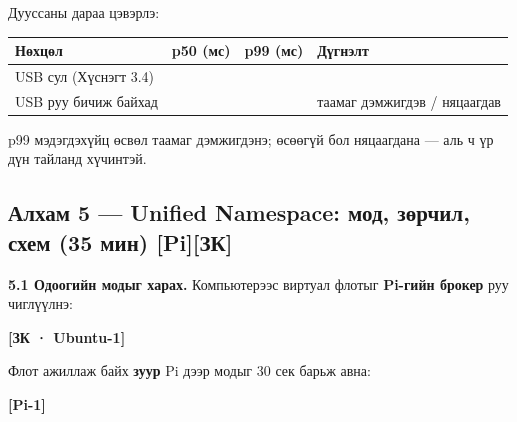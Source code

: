 Дууссаны дараа цэвэрлэ:

\begin{Shaded}
\begin{Highlighting}[]
\KeywordTok{\&\&} 
\end{Highlighting}
\end{Shaded}

\begingroup\scriptsize\begin{longtable}[]{@{}llll@{}}
\toprule
Нөхцөл & p50 (мс) & p99 (мс) & Дүгнэлт\tabularnewline
\midrule
\endhead
USB сул (Хүснэгт 3.4) & & &\tabularnewline
USB руу бичиж байхад & & & таамаг дэмжигдэв / няцаагдав\tabularnewline
\bottomrule
\end{longtable}\endgroup

p99 мэдэгдэхүйц өсвөл таамаг дэмжигдэнэ; өсөөгүй бол няцаагдана --- аль ч үр дүн тайланд хүчинтэй.

\hypertarget{ux430ux43bux445ux430ux43c-5-unified-namespace-ux43cux43eux434-ux437ux4e9ux440ux447ux438ux43b-ux441ux445ux435ux43c-35-ux43cux438ux43d-piux437ux43a}{%
\subsection{Алхам 5 --- Unified Namespace: мод, зөрчил, схем (35 мин) {[}Pi{]}{[}ЗК{]}}\label{ux430ux43bux445ux430ux43c-5-unified-namespace-ux43cux43eux434-ux437ux4e9ux440ux447ux438ux43b-ux441ux445ux435ux43c-35-ux43cux438ux43d-piux437ux43a}}

\textbf{5.1 Одоогийн модыг харах.} Компьютерээс виртуал флотыг \textbf{Pi-гийн брокер} руу чиглүүлнэ:

\textbf{{[}ЗК · Ubuntu-1{]}}

\begin{Shaded}
\begin{Highlighting}[]
\OperatorTok{\textless{}}\OperatorTok{\textgreater{}}
\end{Highlighting}
\end{Shaded}

Флот ажиллаж байх \textbf{зуур} Pi дээр модыг 30 сек барьж авна:

\textbf{{[}Pi-1{]}}

\begin{Shaded}
\begin{Highlighting}[]
 \KeywordTok{\textbackslash{}}
     \KeywordTok{|} 
\end{Highlighting}
\end{Shaded}

